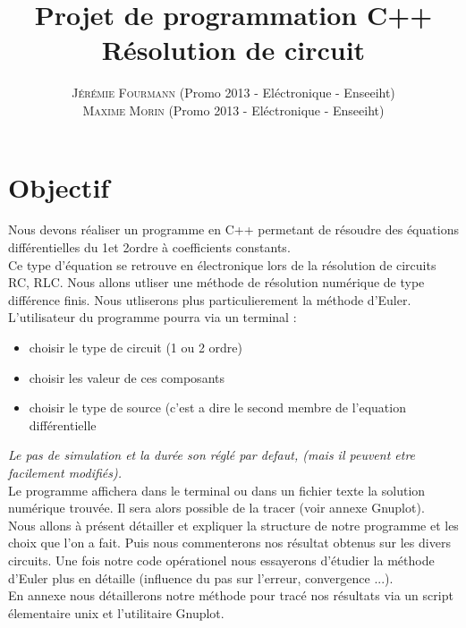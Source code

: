 \documentclass[a4paper,11pt]{article}
\title{\textbf{ \huge{Projet de programmation C++}} \\{\Large  Résolution de circuit}}
\author{
\textsc{Jérémie Fourmann} (Promo 2013 - Eléctronique - Enseeiht)\\ %
\textsc{Maxime Morin} (Promo 2013 - Eléctronique - Enseeiht)\\ %
}
\begin{document}
\pagestyle{plain}

\maketitle
\vspace{1cm}
\renewcommand{\contentsname}{Plan}
\tableofcontents
\vspace{2cm}



\newpage



\section{Objectif}
Nous devons réaliser un programme en C++ permetant de résoudre des équations différentielles du 1\ier et 2\ieme ordre à coefficients constants.\\
Ce type d'équation se retrouve en électronique lors de la résolution de circuits RC, RLC. Nous allons utliser une méthode de résolution 
numérique de type différence finis. Nous utliserons plus particulierement la méthode d'Euler.\\

L'utilisateur du programme pourra via un terminal :
\begin{itemize}
 \item choisir le type de circuit (1 ou 2 ordre)
 \item choisir les valeur de ces composants
 \item choisir le type de source (c'est a dire le second membre de l'equation différentielle\\
\end{itemize}

\emph{Le pas de simulation et la durée son réglé par defaut, (mais il peuvent etre facilement modifiés).}\\

Le programme affichera dans le terminal ou dans un fichier texte la solution numérique trouvée. Il sera alors possible de la tracer (voir annexe Gnuplot).\\

Nous allons à présent détailler et expliquer la structure de notre programme et les choix que l'on a fait. Puis nous commenterons nos 
résultat obtenus sur les divers circuits. 
Une fois notre code opérationel nous essayerons d'étudier la méthode d'Euler plus en détaille (influence du pas sur l'erreur, convergence ...).\\
En annexe nous détaillerons notre méthode pour tracé nos résultats via un script élementaire unix et l'utilitaire Gnuplot.
\newpage
\end{document}
